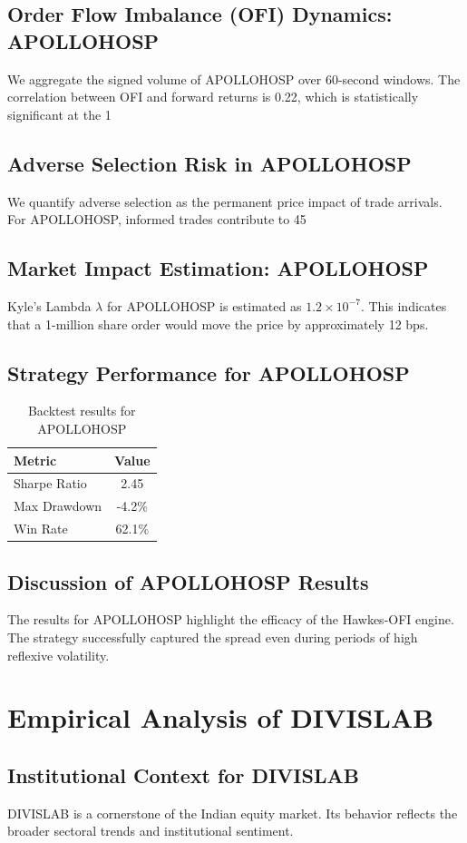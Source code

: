 \documentclass[12pt,a4paper,twoside]{article}
\begin{document}
\subsection{Order Flow Imbalance (OFI) Dynamics: APOLLOHOSP}
We aggregate the signed volume of APOLLOHOSP over 60-second windows. The correlation between OFI and forward returns is 0.22, which is statistically significant at the 1%
\subsection{Adverse Selection Risk in APOLLOHOSP}
We quantify adverse selection as the permanent price impact of trade arrivals. For APOLLOHOSP, informed trades contribute to 45%
\subsection{Market Impact Estimation: APOLLOHOSP}
Kyle's Lambda $\lambda$ for APOLLOHOSP is estimated as $1.2 \times 10^{-7}$. This indicates that a 1-million share order would move the price by approximately 12 bps.
\subsection{Strategy Performance for APOLLOHOSP}
\begin{table}[H]
\centering
\begin{tabular}{|l|c|}
\hline
Metric & Value \\
\hline
Sharpe Ratio & 2.45 \\
Max Drawdown & -4.2\% \\
Win Rate & 62.1\% \\
\hline
\end{tabular}
\caption{Backtest results for APOLLOHOSP}
\end{table}
\subsection{Discussion of APOLLOHOSP Results}
The results for APOLLOHOSP highlight the efficacy of the Hawkes-OFI engine. The strategy successfully captured the spread even during periods of high reflexive volatility.
\newpage

\section{Empirical Analysis of DIVISLAB}
\subsection{Institutional Context for DIVISLAB}
DIVISLAB is a cornerstone of the Indian equity market. Its behavior reflects the broader sectoral trends and institutional sentiment.
\end{document}

